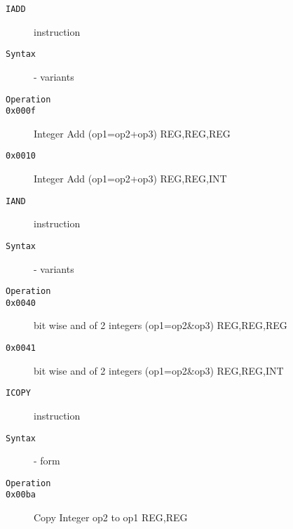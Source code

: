 \clearpage
\begin{description}
\item[\texttt{IADD}] instruction\\
\item[\texttt{Syntax}] - variants\\

\item[\texttt{Operation}]
\item[\texttt{}]
\item[\texttt{0x000f}] Integer Add (op1=op2+op3)  {REG,REG,REG}       \\
\item[\texttt{0x0010}] Integer Add (op1=op2+op3)  {REG,REG,INT}       \\
\end{description}
\clearpage
\begin{description}
\item[\texttt{IAND}] instruction\\
\item[\texttt{Syntax}] - variants\\

\item[\texttt{Operation}]
\item[\texttt{}]
\item[\texttt{0x0040}] bit wise and of 2 integers (op1=op2\&op3)  {REG,REG,REG}       \\
\item[\texttt{0x0041}] bit wise and of 2 integers (op1=op2\&op3)  {REG,REG,INT}       \\
\end{description}
\clearpage
\begin{description}
\item[\texttt{ICOPY}] instruction\\
\item[\texttt{Syntax}] - form \\

\item[\texttt{Operation}]
\item[\texttt{}]
\item[\texttt{0x00ba}] Copy Integer op2 to op1  {REG,REG}           \\
\end{description}
